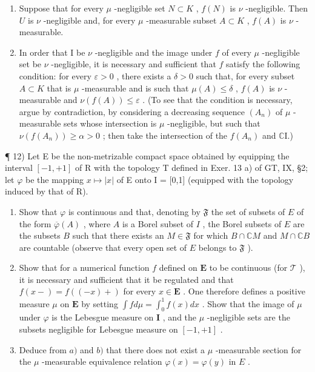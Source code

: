 \begin{enumerate}
\def\labelenumi{\alph{enumi})}
\item
  Suppose that for every \(\mu\) -negligible set \(N \subset K\) , \(f(N)\) is \(\nu\) -negligible. Then \(U\) is \(\nu\) -negligible and, for every \(\mu\) -measurable subset \(A \subset K\) , \(f(A)\) is \(\nu\) -measurable.
\item
  In order that I be \(\nu\) -negligible and the image under \(f\) of every \(\mu\) -negligible set be \(\nu\) -negligible, it is necessary and sufficient that \(f\) satisfy the following condition: for every \(\varepsilon > 0\) , there exists a \(\delta > 0\) such that, for every subset \(A \subset K\) that is \(\mu\) -measurable and is such that \(\mu(A) \leqslant \delta\) , \(f(A)\) is \(\nu\) -measurable and \(\nu(f(A)) \leqslant \varepsilon\) . (To see that the condition is necessary, argue by contradiction, by considering a decreasing sequence \((A_n)\) of \(\mu\) -measurable sets whose intersection is \(\mu\) -negligible, but such that \(\nu(f(A_n)) \geqslant \alpha > 0\) ; then take the intersection of the \(f(A_n)\) and \(\mathbb{C}\mathrm{I}\).)
\end{enumerate}

¶ 12) Let E be the non-metrizable compact space obtained by equipping the interval \([-1,+1]\) of R with the topology T defined in Exer. 13 a) of GT, IX, §2; let \(\varphi\) be the mapping \(x \mapsto |x|\) of E onto I = {[}0,1{]} (equipped with the topology induced by that of R).

\begin{enumerate}
\def\labelenumi{\alph{enumi})}
\item
  Show that \(\varphi\) is continuous and that, denoting by \(\mathfrak{F}\) the set of subsets of \(E\) of the form \(\overline{\varphi}(A)\) , where \(A\) is a Borel subset of \(I\) , the Borel subsets of \(E\) are the subsets \(B\) such that there exists an \(M \in \mathfrak{F}\) for which \(B \cap \mathbb{C}M\) and \(M \cap \mathbb{C}B\) are countable (observe that every open set of \(E\) belongs to \(\mathfrak{F}\) ).
\item
  Show that for a numerical function \(f\) defined on \(\mathbf{E}\) to be continuous (for \(\mathcal{T}\) ), it is necessary and sufficient that it be regulated and that \(f(x-) = f((-x)+)\) for every \(x \in \mathbf{E}\) . One therefore defines a positive measure \(\mu\) on \(\mathbf{E}\) by setting \(\int f d\mu = \int_0^1 f(x) dx\) . Show that the image of \(\mu\) under \(\varphi\) is the Lebesgue measure on \(\mathbf{I}\) , and the \(\mu\) -negligible sets are the subsets negligible for Lebesgue measure on \([-1, +1]\) .
\item
  Deduce from \(a)\) and \(b)\) that there does not exist a \(\mu\) -measurable section for the \(\mu\) -measurable equivalence relation \(\varphi(x) = \varphi(y)\) in \(E\) .
\end{enumerate}

